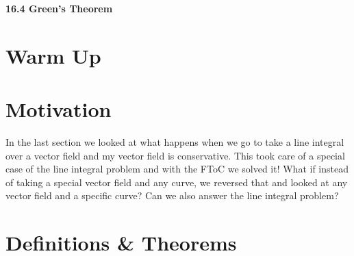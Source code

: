 \documentclass[11pt]{article}
\newcommand{\vs}{\vspace*{.1in}}
\begin{document}
\begin{LARGE}\begin{center}\bf 16.4 Green's Theorem\end{center}
\end{LARGE}

\vs\vs



\section{Warm Up}


\section{Motivation}
In the last section we looked at what happens when we go to take a line integral over a vector field and my vector field is conservative. This took care of a special case of the line integral problem and with the FToC we solved it! What if instead of taking a special vector field and any curve, we reversed that and looked at any vector field and a specific curve? Can we also answer the line integral problem?



\section{Definitions \& Theorems}
\end{document}
